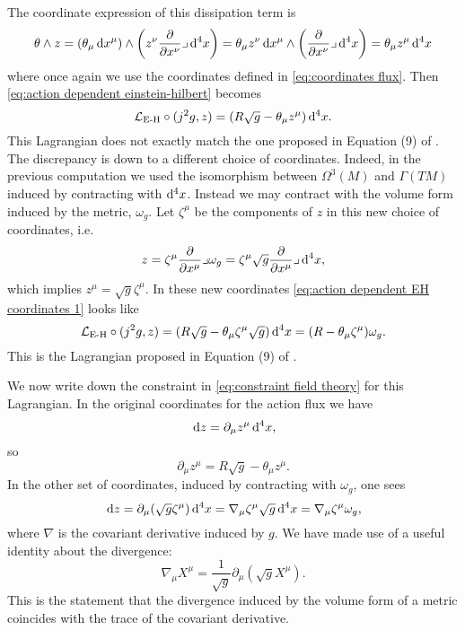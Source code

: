 \documentclass[../main.tex]{subfiles}
\begin{document}
The coordinate expression of this dissipation term is
\begin{equation*}
	\theta \wedge z = (\theta_\mu \,\mathrm{d} x^\mu) \wedge \left(z^\nu \frac{\partial}{\partial x^\nu}\lrcorner \,\mathrm{d}^4 x\right) = \theta_\mu z^\nu \,\mathrm{d}
	x^\mu \wedge \left(\frac{\partial}{\partial x^\nu}\lrcorner \,\mathrm{d}^4 x\right) = \theta_\mu z^\mu \,\mathrm{d}^4x
\end{equation*}
where once again we use the coordinates defined in \cref{eq:coordinates flux}. Then \cref{eq:action dependent einstein-hilbert} becomes 
\begin{equation}\label{eq:action dependent EH coordinates 1}
	\mathcal{L}_{\text{E-H}} \circ (j^2g, z) = (R\sqrt{g} - \theta_\mu
	z^\mu) \,\mathrm{d}^4 x. 
\end{equation}
This Lagrangian does not exactly match the one proposed in Equation (9) of \cite{Lazo2017}. The discrepancy is down to a different choice of coordinates. Indeed, in the previous computation we used the isomorphism between \(\Omega^3(M)\) and \(\Gamma(TM)\) induced by contracting with \(\mathrm{d}^4x\). Instead we may contract with the volume form induced by the metric, \(\omega_g\). Let \(\zeta^\mu\) be the components of \(z\) in this new choice of coordinates, i.e.
\begin{equation*}
	z = \zeta^\mu \frac{\partial}{\partial x^\mu} \lrcorner \omega_{g} = \zeta^\mu \sqrt{g} \frac{\partial}{\partial x^\mu} \lrcorner \,\mathrm{d}^4x,
\end{equation*}
which implies \( z^\mu = \sqrt{g} \zeta^\mu \). In these new coordinates \cref{eq:action dependent EH coordinates 1} looks like
\begin{equation}\label{eq:action dependent EH coordinates 2}
	\mathcal{L}_{\text{E-H}} \circ (j^2g, z) = (R\sqrt{g} - \theta_\mu
	\zeta^\mu \sqrt{g}) \,\mathrm{d}^4 x = (R - \theta_\mu \zeta^\mu)\omega_g.
\end{equation}
This is the Lagrangian proposed in Equation (9) of \cite{Lazo2017}. 

We now write down the constraint in \cref{eq:constraint field theory} for this Lagrangian.
In the original coordinates for the action flux we have
\begin{equation*}
	\,\mathrm{d} z = \partial_\mu z^\mu \,\mathrm{d}^4 x,
\end{equation*}
so
\begin{equation} \label{eq:constraint coordinates 1}
	\partial_\mu z^\mu = R\sqrt{g} - \theta_\mu z^\mu. 
\end{equation}
In the other set of coordinates, induced by contracting with \(\omega_g\), one sees
\begin{equation*}
	\,\mathrm{d} z = \partial_\mu (\sqrt{g} \zeta^\mu) \,\mathrm{d}^4 x = \nabla_\mu \zeta^\mu \sqrt{g}\,\mathrm{d}^4x
	= \nabla_\mu \zeta^\mu \omega_g,
\end{equation*}
where \( \nabla \) is the covariant derivative induced by \( g \). We have made use of a
useful identity about the divergence:
\begin{equation} \label{eq:divergence identity}
	\nabla_\mu X^\mu = \frac{1}{\sqrt{g}} \partial_\mu (\sqrt{g}X^\mu).
\end{equation}
This is the statement that the divergence induced by the volume form of a metric coincides with the trace of the covariant derivative. 
\end{document}
